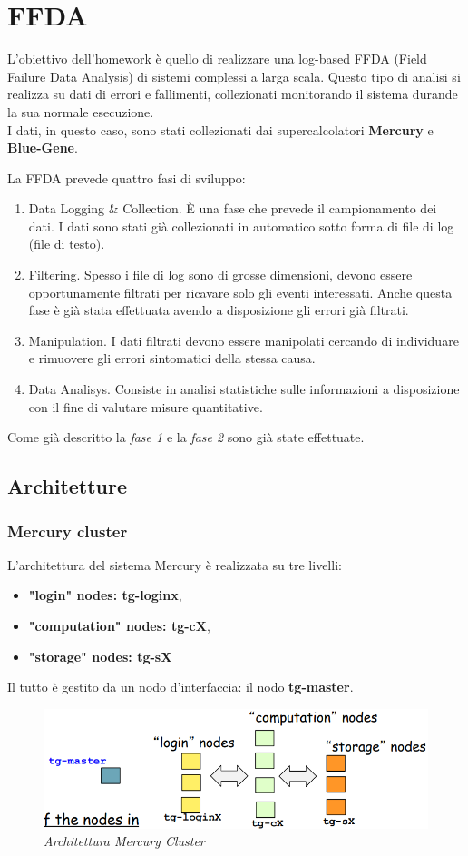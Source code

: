 \chapter{FFDA}
L'obiettivo dell'homework è quello di realizzare una log-based FFDA (Field Failure Data Analysis) di sistemi complessi a larga scala. Questo tipo di analisi si realizza su dati di errori e fallimenti, collezionati monitorando il sistema durande la sua normale esecuzione.
\\I dati, in questo caso, sono stati collezionati dai supercalcolatori \textbf{Mercury} e \textbf{Blue-Gene}. 

La FFDA prevede quattro fasi di sviluppo:
\begin{enumerate}
	\item Data Logging \& Collection. \`{E} una fase che prevede il campionamento dei dati. I dati sono stati già collezionati in automatico sotto forma di file di log (file di testo).
	\item Filtering. Spesso i file di log sono di grosse dimensioni, devono essere opportunamente filtrati per ricavare solo gli eventi interessati. Anche questa fase è già stata effettuata avendo a disposizione gli errori già filtrati.
	\item Manipulation. I dati filtrati devono essere manipolati cercando di individuare e rimuovere gli errori sintomatici della stessa causa.
	\item Data Analisys. Consiste in analisi statistiche sulle informazioni a disposizione con il fine di valutare misure quantitative.
\end{enumerate}
Come già descritto la \textit{fase 1} e la \textit{fase 2} sono già state effettuate.
\section{Architetture}
\subsection{Mercury cluster}
L'architettura del sistema Mercury è realizzata su tre livelli:
\begin{itemize}
	\item \textbf{"login" nodes: tg-loginx},
	\item \textbf{"computation" nodes: tg-cX},
	\item \textbf{"storage" nodes: tg-sX}
\end{itemize}
Il tutto è gestito da un nodo d'interfaccia: il nodo \textbf{tg-master}.
\begin{figure}[H]
	\centering
	\includegraphics[width=\textwidth]{img/hw6/mercury_a.png}
	\caption{\textit{Architettura Mercury Cluster}}
\end{figure}
